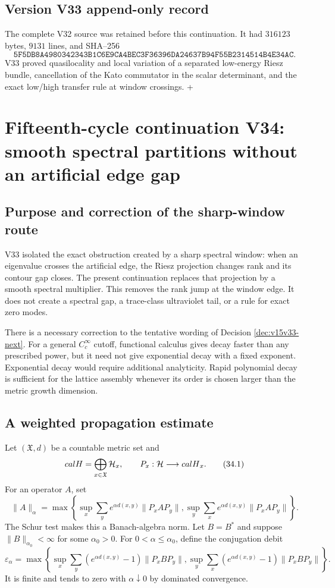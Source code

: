 \documentclass[11pt]{article}
\theoremstyle{remark}
\begin{document}
\section*{Version V33 append-only record}
The complete V32 source was retained before this continuation.  It
had \(316123\) bytes, \(9131\) lines, and SHA--256
\[
 \texttt{5F5DB8A4980342343B1C6E9CA4BEC3F36396DA24637B94F55B2314514B4E34AC}.
\]
V33 proved quasilocality and local variation of a separated
low-energy Riesz bundle, cancellation of the Kato commutator in the
scalar determinant, and the exact low/high transfer rule at window
crossings.
\n+\chapter{Fifteenth-cycle continuation V34: smooth spectral partitions without an artificial edge gap}
\label{sec:v15v34}

\section{Purpose and correction of the sharp-window route}

V33 isolated the exact obstruction created by a sharp spectral
window: when an eigenvalue crosses the artificial edge, the Riesz
projection changes rank and its contour gap closes.  The present
continuation replaces that projection by a smooth spectral
multiplier.  This removes the rank jump at the window edge.  It does
not create a spectral gap, a trace-class ultraviolet tail, or a rule
for exact zero modes.

There is a necessary correction to the tentative wording of
Decision \ref{dec:v15v33-next}.  For a general
\(C^\infty_c\) cutoff, functional calculus gives decay faster than
any prescribed power, but it need not give exponential decay with a
fixed exponent.  Exponential decay would require additional
analyticity.  Rapid polynomial decay is sufficient for the lattice
assembly whenever its order is chosen larger than the metric growth
dimension.

\section{A weighted propagation estimate}

Let \((\mathfrak X,d)\) be a countable metric set and
\[
 {cal H}=\bigoplus_{x\in\mathfrak X}{\cal H}_x,
 \qquad P_x:{\cal H}\longrightarrow{cal H}_x.             \tag{34.1}
\]
For an operator \(A\), set
\[
 \|A\|_\alpha=
 \max\left\{
 \sup_x\sum_y e^{\alpha d(x,y)}\|P_xAP_y\|,
 \sup_y\sum_x e^{\alpha d(x,y)}\|P_xAP_y\|
 \right\}.                                                \tag{34.2}
\]
The Schur test makes this a Banach-algebra norm.  Let
\(B=B^*\) and suppose \(\|B\|_{\alpha_0}<\infty\) for some
\(\alpha_0>0\).  For \(0<\alpha\leq\alpha_0\), define the
conjugation debit
\[
 \varepsilon_\alpha=
 \max\left\{
 \sup_x\sum_y
   (e^{\alpha d(x,y)}-1)\|P_xBP_y\|,
 \sup_y\sum_x
   (e^{\alpha d(x,y)}-1)\|P_xBP_y\|
 \right\}.                                                \tag{34.3}
\]
It is finite and tends to zero with \(\alpha\downarrow0\) by
dominated convergence.
\end{document}
